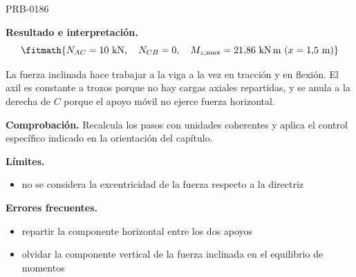 \begin{studiumworked}{PRB-0186}
\begin{minipage}{\linewidth}
%
\fi
\fi
\endgroup
\par\nopagebreak
{}
\end{minipage}\par\medskip

\textbf{Resultado e interpretación.}\[\fitmath{N_{AC} = 10\ \mathrm{kN},\quad N_{CB} = 0,\quad M_{z,\max} = 21{,}86\ \mathrm{kN\,m}\ (x = 1{,}5\ \mathrm{m})}\]

La fuerza inclinada hace trabajar a la viga a la vez en tracción y en flexión. El axil es constante a trozos porque no hay cargas axiales repartidas, y se anula a la derecha de $C$ porque el apoyo móvil no ejerce fuerza horizontal.

\par\textbf{Comprobación.} Recalcula los pasos con unidades coherentes y aplica el control específico indicado en la orientación del capítulo.

\textbf{Límites.}\begin{itemize}\item no se considera la excentricidad de la fuerza respecto a la directriz\end{itemize}

\textbf{Errores frecuentes.}\begin{itemize}\item repartir la componente horizontal entre los dos apoyos
\item olvidar la componente vertical de la fuerza inclinada en el equilibrio de momentos\end{itemize}

\end{studiumworked}

\Needspace{.3\textheight}


